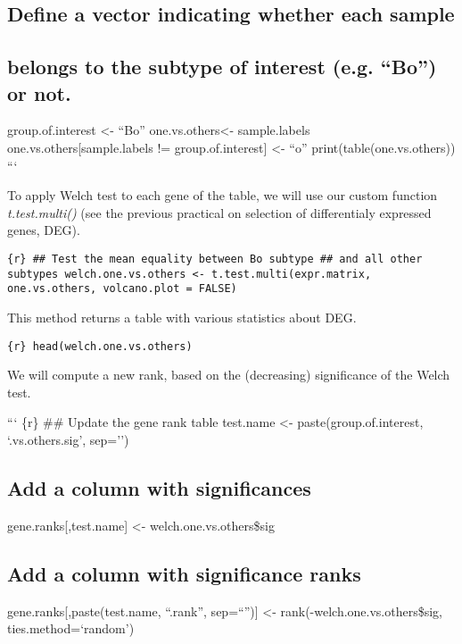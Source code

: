\subsection{Define a vector indicating whether each
sample}\label{define-a-vector-indicating-whether-each-sample}

\subsection{belongs to the subtype of interest (e.g. ``Bo'') or
not.}\label{belongs-to-the-subtype-of-interest-e.g.-bo-or-not.}

group.of.interest \textless{}- ``Bo'' one.vs.others\textless{}-
sample.labels one.vs.others{[}sample.labels != group.of.interest{]}
\textless{}- ``o'' print(table(one.vs.others)) ```

To apply Welch test to each gene of the table, we will use our custom
function \emph{t.test.multi()} (see the previous practical on selection
of differentialy expressed genes, {DEG}).

\texttt{\{r\} \#\# Test the mean equality between Bo subtype  \#\# and all other subtypes  welch.one.vs.others \textless{}- t.test.multi(expr.matrix,                                      one.vs.others,                                     volcano.plot = FALSE)}

This method returns a table with various statistics about DEG.

\texttt{\{r\} head(welch.one.vs.others)}

We will compute a new rank, based on the (decreasing) significance of
the Welch test.

``` \{r\} \#\# Update the gene rank table test.name \textless{}-
paste(group.of.interest, `.vs.others.sig', sep='')

\subsection{Add a column with
significances}\label{add-a-column-with-significances}

gene.ranks{[},test.name{]} \textless{}- welch.one.vs.others\$sig

\subsection{Add a column with significance
ranks}\label{add-a-column-with-significance-ranks}

gene.ranks{[},paste(test.name, ``.rank'', sep=``''){]} \textless{}-
rank(-welch.one.vs.others\$sig, ties.method=`random')


